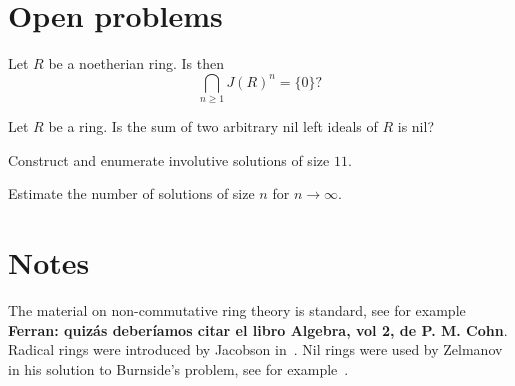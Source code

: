 \section{Open problems}






\begin{problem}[Jacobson]
\label{prob:Jacobson}
Let $R$ be a noetherian ring. Is then 
\[
\bigcap_{n\geq1}J(R)^n=\{0\}?
\]
\end{problem}

\begin{problem}[K\"othe]
	\label{prob:Koethe}
	Let $R$ be a ring. Is the sum 
	of two arbitrary nil left ideals of $R$ is nil?
\end{problem}

\begin{problem}
	Construct and enumerate involutive solutions of size $11$. 
\end{problem}

\begin{problem}
	Estimate the number of solutions of size $n$ for $n\to\infty$. 
\end{problem}

\section*{Notes}

The material on non-commutative ring theory is standard, see for example~\cite{MR3308118} {\bf Ferran: quiz\'as deber\'{i}amos citar el libro Algebra, vol 2, de P. M. Cohn}.
Radical rings were introduced by Jacobson in~\cite{MR12271}. Nil rings were
used by Zelmanov in his solution to Burnside's problem, see for example~\cite{MR1199575}. 

